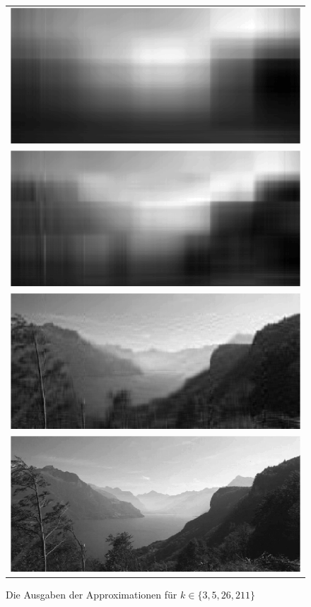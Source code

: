 \documentclass[a4paper]{scrartcl}
\begin{document}
\begin{aufgabe}
\begin{enumerate}[a)]
			\begin{figure}[h]
				\centering
				\caption{Die Ausgaben der Approximationen für $k\in \{3,5,26,211\} $ }
				\begin{tabular}{c}
					\includegraphics[scale=0.4]{num1_6_4/k3.png} 
					\\ \includegraphics[scale=0.4]{num1_6_4/k5.png} \\
					\includegraphics[scale=0.4]{num1_6_4/k26.png} 
					\\ \includegraphics[scale=0.4]{num1_6_4/k211.png}
				\end{tabular}
			\end{figure}
	\end{enumerate}
\end{aufgabe}
\end{document}
